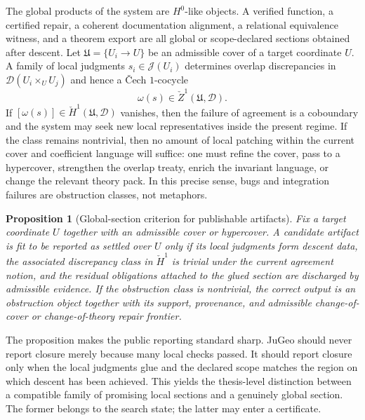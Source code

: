 \documentclass[11pt]{report}
\newtheorem{proposition}[definition]{Proposition}
\begin{document}
The global products of the system are $H^0$-like objects. A verified function, a certified repair, a coherent documentation alignment, a relational equivalence witness, and a theorem export are all global or scope-declared sections obtained after descent. Let $\mathfrak{U}=\{U_i\to U\}$ be an admissible cover of a target coordinate $U$. A family of local judgments $s_i\in\mathscr{J}(U_i)$ determines overlap discrepancies in $\mathscr{D}(U_i\times_U U_j)$ and hence a \v{C}ech $1$-cocycle
\[
\omega(s)\in \check{Z}^{1}(\mathfrak{U},\mathscr{D}).
\]
If $[\omega(s)]\in \check{H}^{1}(\mathfrak{U},\mathscr{D})$ vanishes, then the failure of agreement is a coboundary and the system may seek new local representatives inside the present regime. If the class remains nontrivial, then no amount of local patching within the current cover and coefficient language will suffice: one must refine the cover, pass to a hypercover, strengthen the overlap treaty, enrich the invariant language, or change the relevant theory pack. In this precise sense, bugs and integration failures are obstruction classes, not metaphors.

\begin{proposition}[Global-section criterion for publishable artifacts]
Fix a target coordinate $U$ together with an admissible cover or hypercover. A candidate artifact is fit to be reported as settled over $U$ only if its local judgments form descent data, the associated discrepancy class in $\check{H}^{1}$ is trivial under the current agreement notion, and the residual obligations attached to the glued section are discharged by admissible evidence. If the obstruction class is nontrivial, the correct output is an obstruction object together with its support, provenance, and admissible change-of-cover or change-of-theory repair frontier.
\end{proposition}

The proposition makes the public reporting standard sharp. JuGeo should never report closure merely because many local checks passed. It should report closure only when the local judgments glue and the declared scope matches the region on which descent has been achieved. This yields the thesis-level distinction between a compatible family of promising local sections and a genuinely global section. The former belongs to the search state; the latter may enter a certificate.
\end{document}
